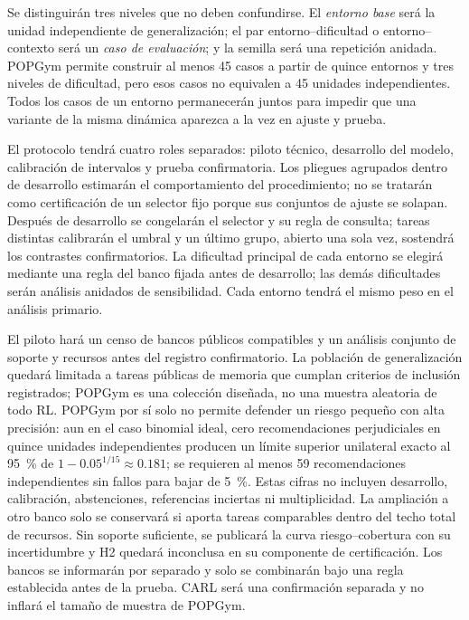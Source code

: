 \documentclass[11pt,letterpaper]{article}
\begin{document}
Se distinguirán tres niveles que no deben confundirse.
El \emph{entorno base} será la unidad independiente de generalización; el par entorno--dificultad o entorno--contexto será un \emph{caso de evaluación}; y la semilla será una repetición anidada.
POPGym permite construir al menos 45 casos a partir de quince entornos y tres niveles de dificultad, pero esos casos no equivalen a 45 unidades independientes.
Todos los casos de un entorno permanecerán juntos para impedir que una variante de la misma dinámica aparezca a la vez en ajuste y prueba.

El protocolo tendrá cuatro roles separados: piloto técnico, desarrollo del modelo, calibración de intervalos y prueba confirmatoria.
Los pliegues agrupados dentro de desarrollo estimarán el comportamiento del procedimiento; no se tratarán como certificación de un selector fijo porque sus conjuntos de ajuste se solapan.
Después de desarrollo se congelarán el selector y su regla de consulta; tareas distintas calibrarán el umbral y un último grupo, abierto una sola vez, sostendrá los contrastes confirmatorios.
La dificultad principal de cada entorno se elegirá mediante una regla del banco fijada antes de desarrollo; las demás dificultades serán análisis anidados de sensibilidad.
Cada entorno tendrá el mismo peso en el análisis primario.

El piloto hará un censo de bancos públicos compatibles y un análisis conjunto de soporte y recursos antes del registro confirmatorio.
La población de generalización quedará limitada a tareas públicas de memoria que cumplan criterios de inclusión registrados; POPGym es una colección diseñada, no una muestra aleatoria de todo RL.
POPGym por sí solo no permite defender un riesgo pequeño con alta precisión: aun en el caso binomial ideal, cero recomendaciones perjudiciales en quince unidades independientes producen un límite superior unilateral exacto al 95~\% de $1-0.05^{1/15}\approx0.181$; se requieren al menos 59 recomendaciones independientes sin fallos para bajar de 5~\%.
Estas cifras no incluyen desarrollo, calibración, abstenciones, referencias inciertas ni multiplicidad.
La ampliación a otro banco solo se conservará si aporta tareas comparables dentro del techo total de recursos.
Sin soporte suficiente, se publicará la curva riesgo--cobertura con su incertidumbre y H2 quedará inconclusa en su componente de certificación.
Los bancos se informarán por separado y solo se combinarán bajo una regla establecida antes de la prueba.
CARL será una confirmación separada y no inflará el tamaño de muestra de POPGym.
\end{document}
